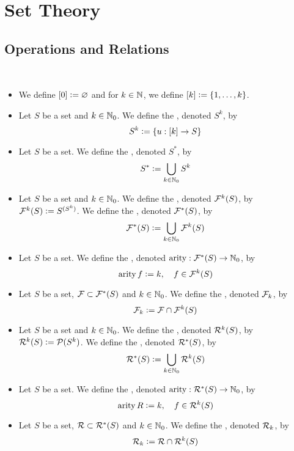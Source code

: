 \chapter{Set Theory}

\section{Operations and Relations}

\begin{defn}\
	\begin{itemize}
		\item We define $[0] \vcentcolon= \varnothing$ and for $k \in \mathbb{N}$, we define $[k] \vcentcolon= \{1, \ldots, k\}$. 
		\item Let $S$ be a set and $k \in \mathbb{N}_0$. We define the , denoted $S^k$, by 
		$$S^k \vcentcolon= \{u: [k] \rightarrow S\}$$
		\item Let $S$ be a set. We define the , denoted $S^*$, by 
		$$S^* \vcentcolon= \bigcup_{k \in \mathbb{N}_0} S^k$$
		\item Let $S$ be a set and $k \in \mathbb{N}_0$. We define the , denoted $\mathcal{F}^k(S)$, by $\mathcal{F}^k(S) \vcentcolon= S^{(S^k)}$. We define the , denoted $\mathcal{F}^*(S)$, by
		$$\mathcal{F}^*(S) \vcentcolon= \bigcup_{k \in \mathbb{N}_0} \mathcal{F}^k(S)$$
		\item Let $S$ be a set. We define the , denoted $\operatorname*{\text{arity}}: \mathcal{F}^*(S) \rightarrow \mathbb{N}_0$, by 
		$$\operatorname*{\text{arity}} f \vcentcolon= k, \quad f \in \mathcal{F}^k(S)$$
		\item Let $S$ be a set, $\mathcal{F} \subset \mathcal{F}^*(S)$ and $k \in \mathbb{N}_0$. We define the , denoted $\mathcal{F}_k$, by 
		$$\mathcal{F}_k \vcentcolon= \mathcal{F} \cap \mathcal{F}^k(S)$$
		\item Let $S$ be a set and $k \in \mathbb{N}_0$. We define the , denoted $\mathcal{R}^k(S)$, by $\mathcal{R}^k(S) \vcentcolon= \mathcal{P}(S^k)$. We define the , denoted $\mathcal{R}^*(S)$, by
		$$\mathcal{R}^*(S) \vcentcolon= \bigcup_{k \in \mathbb{N}_0} \mathcal{R}^k(S)$$
		\item Let $S$ be a set. We define the , denoted $\operatorname*{\text{arity}}: \mathcal{R}^*(S) \rightarrow \mathbb{N}_0$, by 
		$$\operatorname*{\text{arity}} R \vcentcolon= k, \quad f \in \mathcal{R}^k(S)$$
		\item Let $S$ be a set, $\mathcal{R} \subset \mathcal{R}^*(S)$ and $k \in \mathbb{N}_0$. We define the , denoted $\mathcal{R}_k$, by 
		$$\mathcal{R}_k \vcentcolon= \mathcal{R} \cap \mathcal{R}^k(S)$$
	\end{itemize}
\end{defn}

